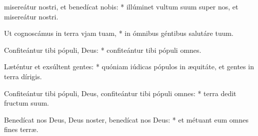\begin{psalmus}

 misereátur nostri, et benedícat nobis: * illúminet vultum suum super nos, et misereátur nostri.

Ut cognoscámus in terra vjam tuam, * in ómnibus géntibus salutáre tuum.

Confiteántur tibi pópuli, Deus: * confiteántur tibi pópuli omnes.

Læténtur et exsúltent gentes: * quóniam iúdicas pópulos in æquitáte, et gentes in terra dírigis.

Confiteántur tibi pópuli, Deus, confiteántur tibi pópuli omnes: * terra dedit fructum suum.

Benedícat nos Deus, Deus noster, benedícat nos Deus: * et métuant eum omnes fines terræ.
        
\end{psalmus}
